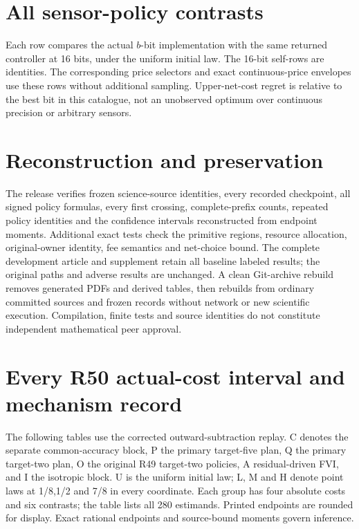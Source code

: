 \documentclass[ecta,nameyear,draft]{econsocart}
\begin{document}
\section{All sensor-policy contrasts}\label{supp:sensors49}
Each row compares the actual $b$-bit implementation with the same returned controller at 16 bits, under the uniform initial law. The 16-bit self-rows are identities. The corresponding price selectors and exact continuous-price envelopes use these rows without additional sampling. Upper-net-cost regret is relative to the best bit in this catalogue, not an unobserved optimum over continuous precision or arbitrary sensors.


\section{Reconstruction and preservation}\label{supp:audit49}
The release verifies frozen science-source identities, every recorded checkpoint, all signed policy formulas, every first crossing, complete-prefix counts, repeated policy identities and the confidence intervals reconstructed from endpoint moments. Additional exact tests check the primitive regions, resource allocation, original-owner identity, fee semantics and net-choice bound. The complete development article and supplement retain all baseline labeled results; the original paths and adverse results are unchanged. A clean Git-archive rebuild removes generated PDFs and derived tables, then rebuilds from ordinary committed sources and frozen records without network or new scientific execution. Compilation, finite tests and source identities do not constitute independent mathematical peer approval.
\section{Every R50 actual-cost interval and mechanism record}\label{supp:records50}
The following tables use the corrected outward-subtraction replay. C denotes the separate common-accuracy block, P the primary target-five plan, Q the primary target-two plan, O the original R49 target-two policies, A residual-driven FVI, and I the isotropic block. U is the uniform initial law; L, M and H denote point laws at 1/8,1/2 and 7/8 in every coordinate. Each group has four absolute costs and six contrasts; the table lists all 280 estimands. Printed endpoints are rounded for display. Exact rational endpoints and source-bound moments govern inference.




\end{document}
